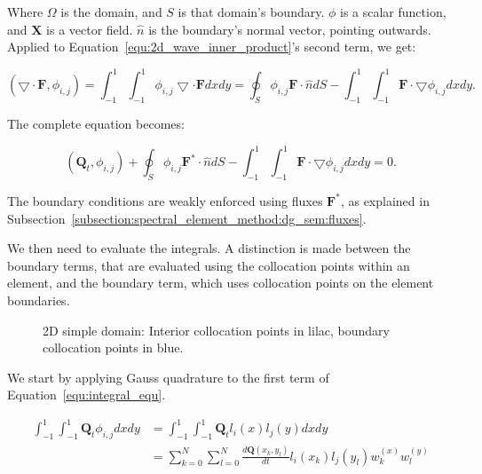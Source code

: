Where $\Omega$ is the domain, and $S$ is that domain's boundary. $\phi$ is a scalar function, and
$\mathbf{X}$ is a vector field. $\widehat{n}$ is the boundary's normal vector, pointing outwards.
Applied to Equation~\ref{equ:2d_wave_inner_product}'s second term, we get:

\begin{equation} \label{equ:flux_green}
    \left( \bigtriangledown \cdot \mathbf{F}, \phi_{i, j} \right) = \int_{-1}^{1}\int_{-1}^{1}\phi_{i, j} \bigtriangledown \cdot \mathbf{F} dx dy = \oint_{S}\phi_{i, j} \mathbf{F} \cdot \widehat{n}dS - \int_{-1}^{1}\int_{-1}^{1} \mathbf{F} \cdot \bigtriangledown \phi_{i, j} dx dy.
\end{equation}

\noindent
The complete equation becomes:

\begin{equation} \label{equ:integral_equ}
    \left( \mathbf{Q}_t, \phi_{i, j} \right) + \oint_{S}\phi_{i, j} \mathbf{F}^* \cdot \widehat{n}dS - \int_{-1}^{1}\int_{-1}^{1} \mathbf{F} \cdot \bigtriangledown \phi_{i, j} dx dy = 0.
\end{equation}

The boundary conditions are weakly enforced using fluxes $\mathbf{F}^*$, as explained in
Subsection~\ref{subsection:spectral_element_method:dg_sem:fluxes}. 

We then need to evaluate the integrals. A distinction is made between the boundary terms, that are
evaluated using the collocation points within an element, and the boundary term, which uses
collocation points on the element boundaries.

\begin{figure}[H]
	\centering
	
	\caption{2D simple domain: Interior collocation points in lilac, boundary collocation points in blue.}
	\label{fig:domain_nodes}
\end{figure}

We start by applying Gauss quadrature to the first term of Equation~\ref{equ:integral_equ}.

\begin{equation}
	\begin{split}
        \int_{-1}^{1}\int_{-1}^{1} \mathbf{Q}_t \phi_{i, j} dx dy 
        &= \int_{-1}^{1}\int_{-1}^{1}\mathbf{Q}_t l_i(x) l_j(y) dx dy \\
        &= \sum_{k = 0}^{N} \sum_{l = 0}^{N}\frac{d\mathbf{Q} \left( x_k, y_l \right)}{dt} l_i(x_k) l_j(y_l) w_k^{(x)} w_l^{(y)}
	\end{split}
\end{equation}

